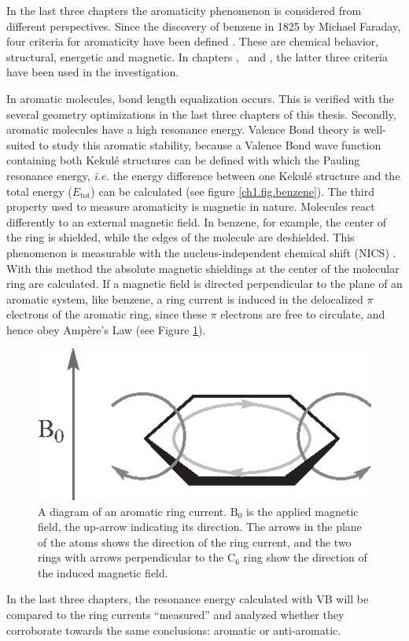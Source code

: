 In the last three chapters the aromaticity phenomenon is considered from different perspectives. Since the discovery of benzene in 1825 by Michael Faraday, four criteria for aromaticity have been defined \cite{aromaticity}. These are chemical behavior, structural, energetic and magnetic. In chapters \chhuckel, \chinorganic\ and \chindacene, the latter three criteria have been used in the investigation. 

In aromatic molecules, bond length equalization occurs. This is verified with the several geometry optimizations in the last three chapters of this thesis. Secondly, aromatic molecules have a high resonance energy. Valence Bond theory is well-suited to study this aromatic stability, because a Valence Bond wave function containing both Kekul\'{e} structures can be defined with which the Pauling resonance energy, \textit{i.e.} the energy difference between one Kekul\'e structure and the total energy ($E_\mathrm{tot}$) can be calculated \cite{pauling5} (see figure \ref{ch1.fig.benzene}). The third property used to measure aromaticity is magnetic in nature. Molecules react differently to an external magnetic field. In benzene, for example, the center of the ring is shielded, while the edges of the molecule are deshielded. This phenomenon is measurable with the nucleus-independent chemical shift (NICS) \cite{schleyer}. With this method the absolute magnetic shieldings at the center of the molecular ring are calculated. If a magnetic field is directed perpendicular to the plane of an aromatic system, like benzene, a ring current is induced in the delocalized $\pi$ electrons of the aromatic ring, since these $\pi$ electrons are free to circulate, and hence obey Amp\`{e}re's Law (see Figure \ref{ch1.fig.ringcurrent}).
\begin{figure}[htp]
\center
\includegraphics{introduction/figures/ringcurrent.eps}
\caption{A diagram of an aromatic ring current. $\mathrm{B_0}$ is the applied magnetic field, the up-arrow indicating its direction. The arrows in the plane of the atoms shows the direction of the ring current, and the two rings with arrows perpendicular to the C$_6$ ring show the direction of the induced magnetic field.}
\label{ch1.fig.ringcurrent}
\end{figure}
In the last three chapters, the resonance energy calculated with VB will be compared to the ring currents ``measured'' and analyzed whether they corroborate towards the same conclusions: aromatic or anti-aromatic.

